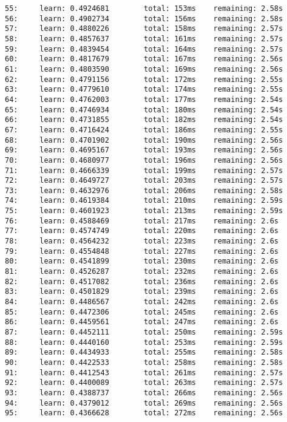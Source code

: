 \documentclass[11pt]{article}
\begin{document}
\begin{Verbatim}[commandchars=\\\{\}]
55:     learn: 0.4924681        total: 153ms    remaining: 2.58s
56:     learn: 0.4902734        total: 156ms    remaining: 2.58s
57:     learn: 0.4880226        total: 158ms    remaining: 2.57s
58:     learn: 0.4857637        total: 161ms    remaining: 2.57s
59:     learn: 0.4839454        total: 164ms    remaining: 2.57s
60:     learn: 0.4817679        total: 167ms    remaining: 2.56s
61:     learn: 0.4803590        total: 169ms    remaining: 2.56s
62:     learn: 0.4791156        total: 172ms    remaining: 2.55s
63:     learn: 0.4779610        total: 174ms    remaining: 2.55s
64:     learn: 0.4762003        total: 177ms    remaining: 2.54s
65:     learn: 0.4746934        total: 180ms    remaining: 2.54s
66:     learn: 0.4731855        total: 182ms    remaining: 2.54s
67:     learn: 0.4716424        total: 186ms    remaining: 2.55s
68:     learn: 0.4701902        total: 190ms    remaining: 2.56s
69:     learn: 0.4695167        total: 193ms    remaining: 2.56s
70:     learn: 0.4680977        total: 196ms    remaining: 2.56s
71:     learn: 0.4666339        total: 199ms    remaining: 2.57s
72:     learn: 0.4649727        total: 203ms    remaining: 2.57s
73:     learn: 0.4632976        total: 206ms    remaining: 2.58s
74:     learn: 0.4619384        total: 210ms    remaining: 2.59s
75:     learn: 0.4601923        total: 213ms    remaining: 2.59s
76:     learn: 0.4588469        total: 217ms    remaining: 2.6s
77:     learn: 0.4574749        total: 220ms    remaining: 2.6s
78:     learn: 0.4564232        total: 223ms    remaining: 2.6s
79:     learn: 0.4554848        total: 227ms    remaining: 2.6s
80:     learn: 0.4541899        total: 230ms    remaining: 2.6s
81:     learn: 0.4526287        total: 232ms    remaining: 2.6s
82:     learn: 0.4517082        total: 236ms    remaining: 2.6s
83:     learn: 0.4501829        total: 239ms    remaining: 2.6s
84:     learn: 0.4486567        total: 242ms    remaining: 2.6s
85:     learn: 0.4472306        total: 245ms    remaining: 2.6s
86:     learn: 0.4459561        total: 247ms    remaining: 2.6s
87:     learn: 0.4452111        total: 250ms    remaining: 2.59s
88:     learn: 0.4440160        total: 253ms    remaining: 2.59s
89:     learn: 0.4434933        total: 255ms    remaining: 2.58s
90:     learn: 0.4422533        total: 258ms    remaining: 2.58s
91:     learn: 0.4412543        total: 261ms    remaining: 2.57s
92:     learn: 0.4400089        total: 263ms    remaining: 2.57s
93:     learn: 0.4388737        total: 266ms    remaining: 2.56s
94:     learn: 0.4379012        total: 269ms    remaining: 2.56s
95:     learn: 0.4366628        total: 272ms    remaining: 2.56s

\end{Verbatim}
\end{document}
